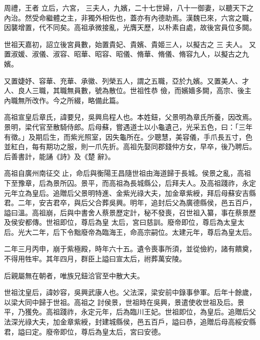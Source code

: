
\begin{pinyinscope}

 周禮，王者
 立后，六宮，
 三夫人，九嬪，二十七世婦，八十一御妻，以聽天下之內治。然受命繼體之主，非獨外相佐也，蓋亦有內德助焉。漢魏已來，六宮之職，因襲增置，代不同矣。高祖承微接亂，光膺天歷，以朴素自處，故後宮員位多闕。



 世祖天嘉初，詔立後宮員數，始置貴妃、貴嬪、貴姬三人，以擬古之
 三
 夫人。
 又置淑媛、淑儀、淑容、昭華、昭容、昭儀、脩華、脩儀、脩容九人，以擬古之九嬪。



 又置婕妤、容華、充華、承徽、列榮五人，謂之五職，亞於九嬪。又置美人、才人、良人三職，其職無員數，號為散位。世祖性恭
 儉，而嬪嬙多闕，高宗、後主內職無所改作。今之所綴，略備此篇。



 高祖宣皇后章氏，諱要兒，吳興烏程人也。本姓鈕，父景明為章氏所養，因改焉。景明，梁代官至散騎侍郎。后母蘇，嘗遇道士以小龜遺己，光采五色，曰：「三年有徵。」及期后生，而紫光照室，因失龜所在。少聰慧，美容儀，手爪長五寸，色並紅白，每有期功之服，則一爪先折。高祖先娶同郡錢仲方女，早卒，後乃聘后。后善書計，能誦《詩》及《楚
 辭》。



 高祖自廣州南征交止，命后與衡陽王昌隨世祖由海道歸于長城。侯景之亂，高祖下至豫章，后為景所囚。景平，而高祖為長城縣公，后拜夫人。及高祖踐祚，永定元年立為皇后。追贈后父景明特進、金紫光祿大夫，加金章紫綬，拜后母蘇安吉縣君。二年，安吉君卒，與后父合葬吳興。明年，追封后父為廣德縣侯，邑五百戶，謚曰溫。高祖崩，后與中書舍人蔡景歷定計，秘不發喪，召世祖入纂，事在蔡景歷及侯安都傳。世祖即位，尊后為皇
 太后，宮曰慈訓。廢帝即位，尊后為太皇太后。光大二年，后下令黜廢帝為臨海王，命高宗嗣位。太建元年，尊后為皇太后。



 二年三月丙申，崩于紫極殿，時年六十五。遺令喪事所須，並從儉約，諸有饋奠，不得用牲牢。其年四月，群臣上謚曰宣太后，祔葬萬安陵。



 后親屬無在朝者，唯族兄鈕洽官至中散大夫。



 世祖沈皇后，諱妙容，吳興武康人也。父法深，梁安前中錄事參軍。后年十餘歲，以梁大同中歸于世祖。高祖之
 討侯景，世祖時在吳興，景遣使收世祖及后。景平，乃獲免。高祖踐祚，永定元年，后為臨川王妃。世祖即位，為皇后。追贈后父法深光祿大夫，加金章紫綬，封建城縣侯，邑五百戶，謚曰恭，追贈后母高綏安縣君，謚曰定。廢帝即位，尊后為皇太后，宮曰安德。




\end{pinyinscope}
